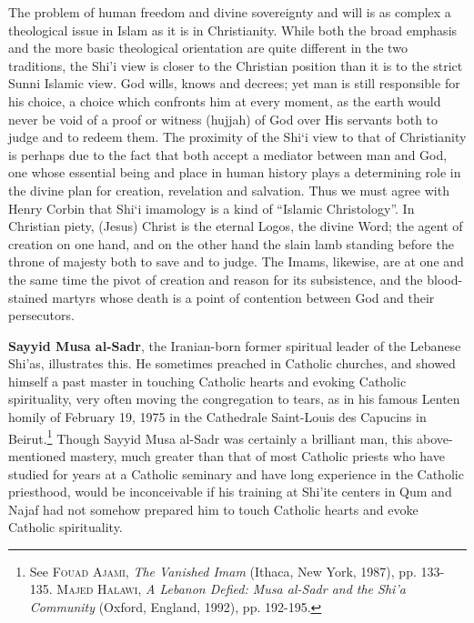 \begin{quotex}
The problem of human freedom and divine sovereignty and will is as complex a theological issue in Islam as it is in Christianity. While both the broad emphasis and the more basic theological orientation are quite different in the two traditions, the Shi'i view is closer to the Christian position than it is to the strict Sunni Islamic view. God wills, knows and decrees; yet man is still responsible for his choice, a choice which confronts him at every moment, as the earth would never be void of a proof or witness (hujjah) of God over His servants both to judge and to redeem them. The proximity of the Shi`i view to that of Christianity is perhaps due to the fact that both accept a mediator between man and God, one whose essential being and place in human history plays a determining role in the divine plan for creation, revelation and salvation. Thus we must agree with Henry Corbin that Shi`i imamology is a kind of ``Islamic Christology''. In Christian piety, (Jesus) Christ is the eternal Logos, the divine Word; the agent of creation on one hand, and on the other hand the slain lamb standing before the throne of majesty both to save and to judge. The Imams, likewise, are at one and the same time the pivot of creation and reason for its subsistence, and the blood-stained martyrs whose death is a point of contention between God and their persecutors.
\end{quotex}


\textbf{Sayyid Musa al-Sadr}, the Iranian-born former spiritual leader of the Lebanese Shi'as, illustrates this. He sometimes preached in Catholic churches, and showed himself a past master in touching Catholic hearts and evoking Catholic spirituality, very often moving the congregation to tears, as in his famous Lenten homily of February 19, 1975 in the Cathedrale Saint-Louis des Capucins in Beirut.\footnote{See \textsc{Fouad Ajami}, \emph{The Vanished Imam} (Ithaca, New York, 1987), pp. 133-135. \textsc{Majed Halawi}, \emph{A Lebanon Defied: Musa al-Sadr and the Shi'a Community} (Oxford, England, 1992), pp. 192-195.} Though Sayyid Musa al-Sadr was certainly a brilliant man, this above-mentioned mastery, much greater than that of most Catholic priests who have studied for years at a Catholic seminary and have long experience in the Catholic priesthood, would be inconceivable if his training at Shi'ite centers in Qum and Najaf had not somehow prepared him to touch Catholic hearts and evoke Catholic spirituality.

